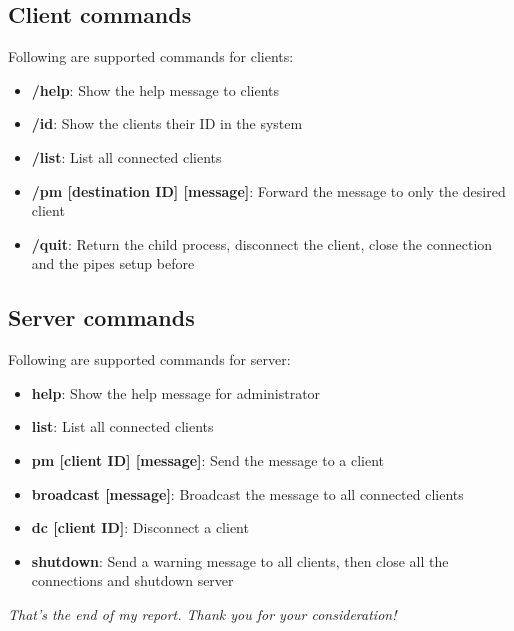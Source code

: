 \documentclass[12pt]{article}
\begin{document}
\subsection{Client commands}

Following are supported commands for clients:

\begin{itemize}
\item \textbf{/help}: Show the help message to clients
\item \textbf{/id}: Show the clients their ID in the system
\item \textbf{/list}: List all connected clients
\item \textbf{/pm [destination ID] [message]}: Forward the message to only the desired client
\item \textbf{/quit}: Return the child process, disconnect the client, close the connection and the pipes setup before
\end{itemize}

\subsection{Server commands}

Following are supported commands for server:

\begin{itemize}
\item \textbf{help}: Show the help message for administrator
\item \textbf{list}: List all connected clients
\item \textbf{pm [client ID] [message]}: Send the message to a client
\item \textbf{broadcast [message]}: Broadcast the message to all connected clients
\item \textbf{dc [client ID]}: Disconnect a client
\item \textbf{shutdown}: Send a warning message to all clients, then close all the connections and shutdown server
\end{itemize}

\vfill
\centering\textit{That's the end of my report. Thank you for your consideration!}
\end{document}
